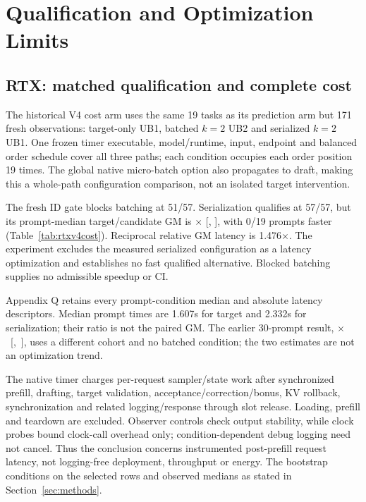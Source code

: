 \section{Qualification and Optimization Limits}
\label{sec:admissibility}
\subsection{RTX: matched qualification and complete cost}
\label{sec:matchedcost}
The historical V4 cost arm uses the same 19 tasks as its prediction arm but 171 fresh observations: target-only UB1, batched $k=2$ UB2 and serialized $k=2$ UB1. One frozen timer executable, model/runtime, input, endpoint and balanced order schedule cover all three paths; each condition occupies each order position 19 times. The global native micro-batch option also propagates to draft, making this a whole-path configuration comparison, not an isolated target intervention.

The fresh ID gate blocks batching at 51/57. Serialization qualifies at 57/57, but its prompt-median target/candidate GM is \VFourCost$\times$ [\VFourCostLo, \VFourCostHi], with 0/19 prompts faster (Table~\ref{tab:rtxv4cost}). Reciprocal relative GM latency is 1.476$\times$. The experiment excludes the measured serialized configuration as a latency optimization and establishes no fast qualified alternative. Blocked batching supplies no admissible speedup or CI.


Appendix Q retains every prompt-condition median and absolute latency descriptors. Median prompt times are 1.607s for target and 2.332s for serialization; their ratio is not the paired GM. The earlier 30-prompt result, \mbox{\FUCost$\times$ [\FUCostLo, \FUCostHi]}, uses a different cohort and no batched condition; the two estimates are not an optimization trend.

The native timer charges per-request sampler/state work after synchronized prefill, drafting, target validation, acceptance/correction/bonus, KV rollback, synchronization and related logging/response through slot release. Loading, prefill and teardown are excluded. Observer controls check output stability, while clock probes bound clock-call overhead only; condition-dependent debug logging need not cancel. Thus the conclusion concerns instrumented post-prefill request latency, not logging-free deployment, throughput or energy. The bootstrap conditions on the selected rows and observed medians as stated in Section~\ref{sec:methods}.

